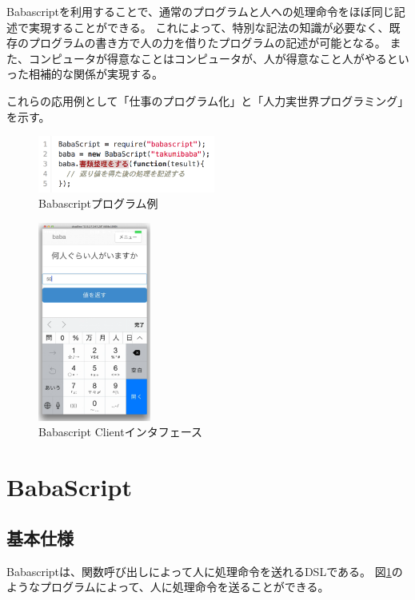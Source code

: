 Babascriptを利用することで、通常のプログラムと人への処理命令をほぼ同じ記述で実現することができる。
これによって、特別な記法の知識が必要なく、既存のプログラムの書き方で人の力を借りたプログラムの記述が可能となる。
また、コンピュータが得意なことはコンピュータが、人が得意なこと人がやるといった相補的な関係が実現する。

これらの応用例として「仕事のプログラム化」と「人力実世界プログラミング」を示す。

\begin{figure}[!h]
  \centering
  \includegraphics[width=220px]{./images/script_01.png}
  \caption{Babascriptプログラム例}
  \label{script_01}
\end{figure}

\begin{figure}[!h]  
  \centering
  \includegraphics[width=140px]{./images/interface.png}
  \caption{Babascript Clientインタフェース}
  \label{webapp-interface}
\end{figure}

\section{BabaScript}\label{babascript}

\subsection{基本仕様}\label{ux57faux672cux4ed5ux69d8}

Babascriptは、関数呼び出しによって人に処理命令を送れるDSLである。
図\ref{script_01}のようなプログラムによって、人に処理命令を送ることができる。

